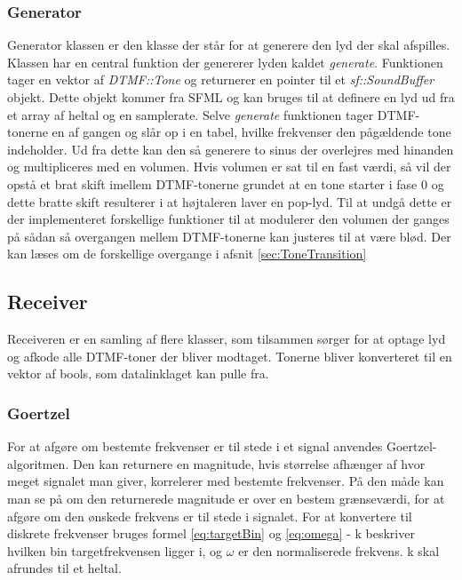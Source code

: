\subsubsection{Generator}
Generator klassen er den klasse der står for at generere den lyd der skal afspilles. Klassen har en central funktion der genererer lyden kaldet \textit{generate}. Funktionen tager en vektor af \textit{DTMF::Tone} og returnerer en pointer til et \textit{sf::SoundBuffer} objekt. Dette objekt kommer fra SFML og kan bruges til at definere en lyd ud fra et array af heltal og en samplerate. Selve \textit{generate} funktionen tager DTMF-tonerne en af gangen og slår op i en tabel, hvilke frekvenser den pågældende tone indeholder. Ud fra dette kan den så generere to sinus der overlejres med hinanden og multipliceres med en volumen. Hvis volumen er sat til en fast værdi, så vil der opstå et brat skift imellem DTMF-tonerne grundet at en tone starter i fase 0 og dette bratte skift resulterer i at højtaleren laver en pop-lyd. Til at undgå dette er der implementeret forskellige funktioner til at modulerer den volumen der ganges på sådan så overgangen mellem DTMF-tonerne kan justeres til at være blød. Der kan læses om de forskellige overgange i afsnit \ref{sec:ToneTransition}




\subsection{Receiver}
Receiveren er en samling af flere klasser, som tilsammen sørger for at optage lyd og afkode alle DTMF-toner der bliver modtaget. Tonerne bliver konverteret til en vektor af bools, som datalinklaget kan pulle fra.

\subsubsection{Goertzel}

For at afgøre om bestemte frekvenser er til stede i et signal anvendes Goertzel-algoritmen. Den kan returnere en magnitude, hvis størrelse afhænger af hvor meget signalet man giver, korrelerer med bestemte frekvenser. På den måde kan man se på om den returnerede magnitude er over en bestem grænseværdi, for at afgøre om den ønskede frekvens er til stede i signalet. 
For at konvertere til diskrete frekvenser bruges formel \eqref{eq:targetBin} og \eqref{eq:omega} - k beskriver hvilken bin targetfrekvensen ligger i, og $\omega$ er den normaliserede frekvens. k skal afrundes til et heltal.

